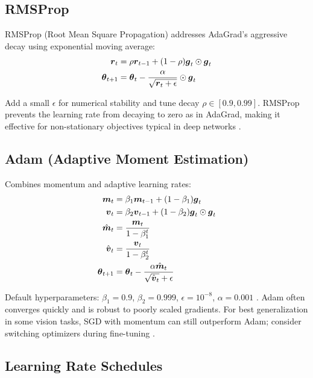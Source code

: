 \subsection{RMSProp}

RMSProp (Root Mean Square Propagation) addresses AdaGrad's aggressive decay using exponential moving average:
\begin{align}
\boldsymbol{r}_t &= \rho \boldsymbol{r}_{t-1} + (1-\rho) \boldsymbol{g}_t \odot \boldsymbol{g}_t \\
\boldsymbol{\theta}_{t+1} &= \boldsymbol{\theta}_t - \frac{\alpha}{\sqrt{\boldsymbol{r}_t + \epsilon}} \odot \boldsymbol{g}_t
\end{align}

Add a small \(\epsilon\) for numerical stability and tune decay \(\rho\in[0.9,0.99]\). RMSProp prevents the learning rate from decaying to zero as in AdaGrad, making it effective for non-stationary objectives typical in deep networks \cite{Tieleman2012,WebOptimizationDLBook,D2LChapterOptimization}.

\subsection{Adam (Adaptive Moment Estimation)}

Combines momentum and adaptive learning rates:
\begin{align}
\boldsymbol{m}_t &= \beta_1 \boldsymbol{m}_{t-1} + (1-\beta_1) \boldsymbol{g}_t \\
\boldsymbol{v}_t &= \beta_2 \boldsymbol{v}_{t-1} + (1-\beta_2) \boldsymbol{g}_t \odot \boldsymbol{g}_t \\
\hat{\boldsymbol{m}}_t &= \frac{\boldsymbol{m}_t}{1 - \beta_1^t} \\
\hat{\boldsymbol{v}}_t &= \frac{\boldsymbol{v}_t}{1 - \beta_2^t} \\
\boldsymbol{\theta}_{t+1} &= \boldsymbol{\theta}_t - \frac{\alpha \hat{\boldsymbol{m}}_t}{\sqrt{\hat{\boldsymbol{v}}_t} + \epsilon}
\end{align}

Default hyperparameters: $\beta_1 = 0.9$, $\beta_2 = 0.999$, $\epsilon = 10^{-8}$, $\alpha = 0.001$ \cite{Kingma2014}. Adam often converges quickly and is robust to poorly scaled gradients. For best generalization in some vision tasks, SGD with momentum can still outperform Adam; consider switching optimizers during fine-tuning \cite{GoodfellowEtAl2016,D2LChapterOptimization,He2016}.

\subsection{Learning Rate Schedules}

